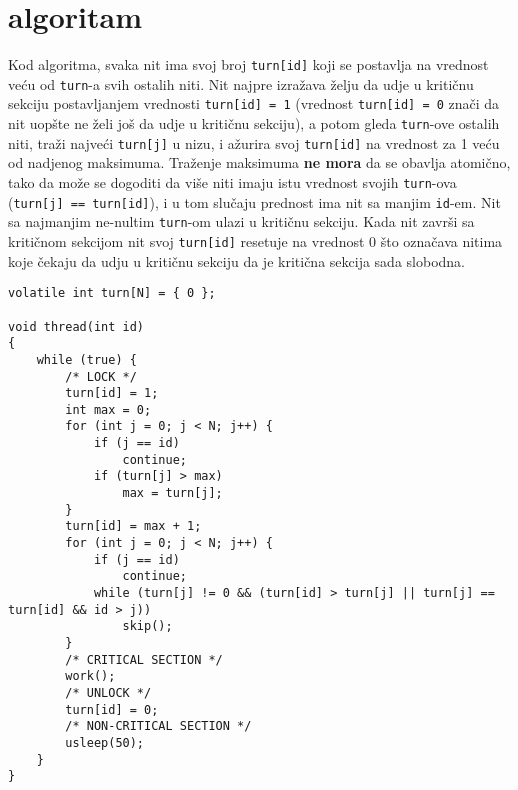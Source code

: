 \clearpage
\section{ algoritam}
Kod \textbf{} algoritma, svaka nit ima svoj broj \texttt{turn[id]} koji se postavlja na vrednost ve\'{c}u od \texttt{turn}-a svih ostalih niti. Nit najpre izra\v{z}ava \v{z}elju da udje u kriti\v{c}nu sekciju postavljanjem vrednosti \texttt{turn[id] = 1} (vrednost \texttt{turn[id] = 0} zna\v{c}i da nit uop\v{s}te ne \v{z}eli jo\v{s} da udje u kriti\v{c}nu sekciju), a potom gleda \texttt{turn}-ove ostalih niti, tra\v{z}i najve\'{c}i \texttt{turn[j]} u nizu, i a\v{z}urira svoj \texttt{turn[id]} na vrednost za 1 ve\'{c}u od nadjenog maksimuma. Tra\v{z}enje maksimuma \textbf{ne mora} da se obavlja atomi\v{c}no, tako da mo\v{z}e se dogoditi da vi\v{s}e niti imaju istu vrednost svojih \texttt{turn}-ova (\texttt{turn[j] == turn[id]}), i u tom slu\v{c}aju prednost ima nit sa manjim \texttt{id}-em. Nit sa najmanjim ne-nultim \texttt{turn}-om ulazi u kriti\v{c}nu sekciju. Kada nit zavr\v{s}i sa kriti\v{c}nom sekcijom nit svoj \texttt{turn[id]} resetuje na vrednost 0 \v{s}to ozna\v{c}ava nitima koje \v{c}ekaju da udju u kriti\v{c}nu sekciju da je kriti\v{c}na sekcija sada slobodna.
\begin{lstlisting}
volatile int turn[N] = { 0 };

void thread(int id)
{
    while (true) {
        /* LOCK */
        turn[id] = 1;
        int max = 0;
        for (int j = 0; j < N; j++) {
            if (j == id)
                continue;
            if (turn[j] > max)
                max = turn[j];
        }
        turn[id] = max + 1;
        for (int j = 0; j < N; j++) {
            if (j == id)
                continue;
            while (turn[j] != 0 && (turn[id] > turn[j] || turn[j] == turn[id] && id > j))
                skip();
        }
        /* CRITICAL SECTION */
        work();
        /* UNLOCK */
        turn[id] = 0;
        /* NON-CRITICAL SECTION */
        usleep(50);
    }
}
\end{lstlisting}